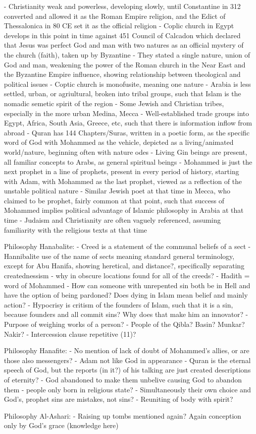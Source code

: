 \documentclass[11 pt, twoside]{article}
\begin{document}
	- Christianity weak and powerless, developing slowly, until Constantine in 312 converted and allowed it as the Roman Empire religion, and the Edict of Thessalonica in 80 CE set it as the official religion
	- Coplic church in Egypt develops in this point in time against 451 Council of Calcadon which declared that Jesus was perfect God and man with two natures as an official mystery of the church (faith), taken up by Byzantine
		- They stated a single nature, union of God and man, weakening the power of the Roman church in the Near East and the Byzantine Empire influence, showing relationship between theological and political issues
		- Coptic church is monofusite, meaning one nature
	- Arabia is less settled, urban, or agriultural, broken into tribal groups, such that Islam is the nomadic semetic spirit of the region
		- Some Jewish and Christian tribes, especially in the more urban Medina, Mecca
		- Well-established trade groups into Egypt, Africa, South Asia, Greece, etc, such that there is information inflow from abroad
- Quran has 144 Chapters/Suras, written in a poetic form, as the specific word of God with Mohammed as the vehicle, depicted as a living/animated world/nature, beginning often with nature odes
	- Living Gin beings are present, all familiar concepts to Arabs, as general spiritual beings
	- Mohammed is just the next prophet in a line of prophets, present in every period of history, starting with Adam, with Mohammed as the last prophet, viewed as a reflection of the unstable political nature
	- Similar Jewish poet at that time in Mecca, who claimed to be prophet, fairly common at that point, such that success of Mohammed implies political advantage of Islamic philosophy in Arabia at that time
	- Judaism and Christianity are often vaguely referenced, assuming familiarity with the religious texts at that time

Philosophy Hanabalite:
- Creed is a statement of the communal beliefs of a sect
- Hannibalite use of the name of sects meaning standard general terminology, except for Abu Hanifa, showing heretical, and distance?, specifically separating creatednessism
- why in obscure locations found for all of the creeds?
- Hadith = word of Mohammed
- How can someone with unrepented sin both be in Hell and have the option of being pardoned? Does dying in Islam mean belief and mainly action?
- Hypocrisy is critism of the founders of Islam, such that it is a sin, because founders and all commit sins? Why does that make him an innovator?
- Purpose of weighing works of a person?
- People of the Qibla? Basin? Munkar? Nakir?
- Intercession clause repetitive (11)?

Philosophy Hanafite:
- No mention of lack of doubt of Mohammed's allies, or are those also messengers?
- Adam not like God in appearance
- Quran is the eternal speech of God, but the reports (in it?) of his talking are just created descriptions of eternity?
- God abandoned to make them unbelive causing God to abandon them - people only born in religious state?
- Simultaneously their own choice and God's, prophet sins are mistakes, not sins?
- Reuniting of body with spirit?

Philosophy Al-Ashari:
- Raising up tombs mentioned again? Again conception only by God's grace (knowledge here)
\end{document}
